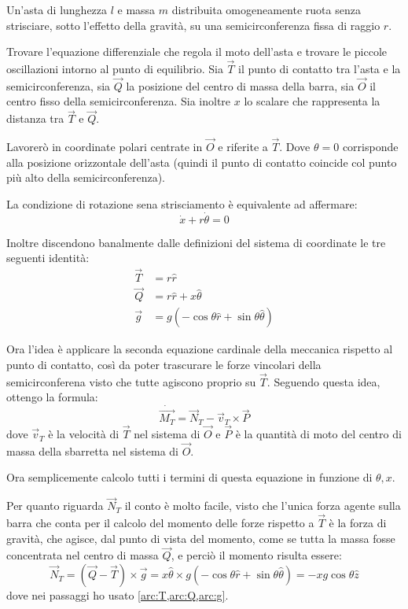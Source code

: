 \documentclass[../main.tex]{subfiles}
\begin{document}

\textex
Un'asta di lunghezza $l$ e massa $m$ distribuita omogeneamente ruota senza strisciare, sotto l'effetto della gravità, su una semicirconferenza fissa di raggio $r$.

Trovare l'equazione differenziale che regola il moto dell'asta e trovare le piccole oscillazioni intorno al punto di equilibrio.
\solution
Sia $\vec T$ il punto di contatto tra l'asta e la semicirconferenza, sia $\vec Q$ la posizione del centro di massa della barra, sia $\vec O$ il centro fisso della semicirconferenza. Sia inoltre $x$ lo scalare che rappresenta la distanza tra $\vec T$ e $\vec Q$.

Lavorerò in coordinate polari centrate in $\vec O$ e riferite a $\vec T$. Dove $\theta=0$ corrisponde alla posizione orizzontale dell'asta (quindi il punto di contatto coincide col punto più alto della semicirconferenza).

La condizione di rotazione sena strisciamento è equivalente ad affermare:
\begin{equation}\label{arc:NoStrisciamento}
	\dot x + r\dot \theta = 0
\end{equation}

Inoltre discendono banalmente dalle definizioni del sistema di coordinate le tre seguenti identità:
\begin{align}
	\vec T &=r\hat r \label{arc:T}\\
	\vec Q &=r\hat r+x\hat{\theta} \label{arc:Q}\\
	\vec g &=g\left(-\cos\theta\hat r + \sin\theta \hat{\theta} \label{arc:g}\right)
\end{align}

Ora l'idea è applicare la seconda equazione cardinale della meccanica rispetto al punto di contatto, così da poter trascurare le forze vincolari della semicirconferena visto che tutte agiscono proprio su $\vec T$.
Seguendo questa idea, ottengo la formula:
\begin{equation}\label{arc:Cardine}
	\dot{\overrightarrow{M_T}}=\vec N_T - \vec v_T\times \vec P
\end{equation}
dove $\vec v_T$ è la velocità di $\vec T$ nel sistema di $\vec O$ e $\vec P$ è la quantità di moto del centro di massa della sbarretta nel sistema di $\vec O$.

Ora semplicemente calcolo tutti i termini di questa equazione in funzione di $\theta,x$.

Per quanto riguarda $\vec N_T$ il conto è molto facile, visto che l'unica forza agente sulla barra che conta per il calcolo del momento delle forze rispetto a $\vec T$ è la forza di gravità, che agisce, dal punto di vista del momento, come se tutta la massa fosse concentrata nel centro di massa $\vec Q$, e perciò il momento risulta essere:
\begin{equation} \label{arc:MomentoDelleForze}
	\vec N_T = (\vec Q-\vec T)\times \vec g = x\hat{\theta}\times g\left( -\cos\theta\hat r+\sin\theta \hat\theta \right)
	=-xg\cos\theta\hat z
\end{equation}
dove nei passaggi ho usato \cref{arc:T,arc:Q,arc:g}.
\end{document}
